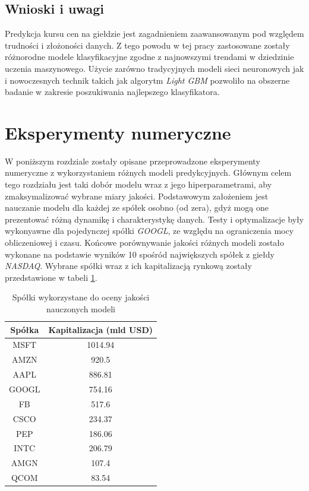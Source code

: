 \documentclass[a4paper, twoside, 11pt, openright]{article}
\begin{document}
\subsection{Wnioski i uwagi}

Predykcja kursu cen na giełdzie jest zagadnieniem zaawansowanym pod względem trudności i złożoności danych. Z tego powodu w tej pracy zastosowane zostały różnorodne modele klasyfikacyjne zgodne z najnowszymi trendami w dziedzinie uczenia maszynowego. Użycie zarówno tradycyjnych modeli sieci neuronowych jak i nowoczesnych technik takich jak algorytm \textit{Light GBM} pozwoliło na obszerne badanie w zakresie poszukiwania najlepszego klasyfikatora.

\newpage

\section{Eksperymenty numeryczne}

W poniższym rozdziale zostały opisane przeprowadzone eksperymenty numeryczne z wykorzystaniem różnych modeli predykcyjnych. Głównym celem tego rozdziału jest taki dobór modelu wraz z jego hiperparametrami, aby zmaksymalizować wybrane miary jakości. Podstawowym założeniem jest nauczanie modelu dla każdej ze spółek osobno (od zera), gdyż mogą one prezentować różną dynamikę i charakterystykę danych. Testy i optymalizacje były wykonyawne dla pojedynczej spółki \textit{GOOGL}, ze względu na ograniczenia mocy obliczeniowej i czasu. Końcowe porównywanie jakości różnych modeli zostało wykonane na podstawie wyników 10 spośród największych spółek z giełdy \textit{NASDAQ}. Wybrane spółki wraz z ich kapitalizacją rynkową zostały przedstawione w tabeli \ref{tab:biggest_companies}.


\begin{table}[H]
    \centering
    \begin{tabular}{|c|c|}
    \hline
        \textbf{Spółka} & \textbf{Kapitalizacja (mld USD)} \\ \hline
        MSFT & 1014.94 \\ \hline 
        AMZN & 920.5 \\ \hline 
        AAPL & 886.81 \\ \hline 
        GOOGL & 754.16 \\ \hline 
        FB & 517.6 \\ \hline 
        CSCO & 234.37 \\ \hline 
        PEP & 186.06 \\ \hline 
        INTC & 206.79 \\ \hline 
        AMGN & 107.4 \\ \hline 
        QCOM & 83.54 \\ \hline 
    \end{tabular}
    \caption{Spółki wykorzystane do oceny jakości nauczonych modeli}
    \label{tab:biggest_companies}
\end{table}
\end{document}
